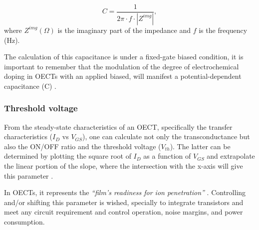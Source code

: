 \begin{equation} \label{eq:C}
	C = \frac{1}{2\pi \cdot f \cdot |Z^{img}|},
\end{equation}
where $Z^{img} (\Omega)$ is the imaginary part of the impedance and $f$ is the frequency (Hz).

The calculation of this capacitance is under a fixed-gate biased condition, it is important to remember that the modulation of the degree of electrochemical doping in OECTs with an applied biased, will manifest a potential-dependent capacitance (C)%
\cite{inalBenchmarkingOrganicMixed2017}.

\subsubsection{Threshold voltage}

From the steady-state characteristics of an OECT, specifically the transfer characteristics ($I_{D}$ vs $V_{GS}$), one can calculate not only the transconductance but also the ON/OFF ratio and the threshold voltage ($V_{th}$). The latter can be determined by plotting the square root of $I_{D}$ as a function of $V_{GS}$ and extrapolate the linear portion of the slope, where the intersection with the x-axis will give this parameter \cite{ohayonGuideCharacterizationOrganic2023}.

In OECTs, it represents the \textit{``film's readiness for ion penetration''} \cite{ohayonGuideCharacterizationOrganic2023}. Controlling and/or shifting this parameter is wished, specially to integrate transistors and meet any circuit requirement and control operation, noise margins, and power consumption. 


